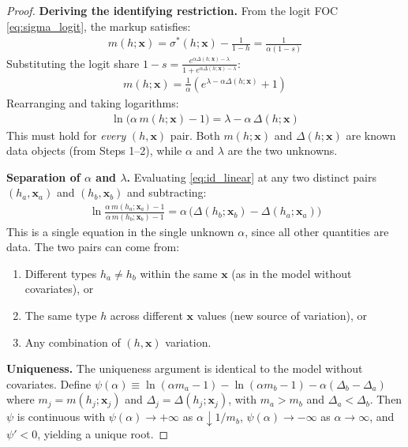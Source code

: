 \documentclass[12pt]{article}
\theoremstyle{plain}
\theoremstyle{plain}
\theoremstyle{definition}  %
\theoremstyle{remark}  %
\begin{document}
\begin{proof}
\textbf{Deriving the identifying restriction.} From the logit FOC \eqref{eq:sigma_logit}, the markup satisfies:
\begin{align*}
    m(h; \mathbf{x}) = \sigma^*(h; \mathbf{x}) - \frac{1}{1-h} = \frac{1}{\alpha(1-s)}
\end{align*}
Substituting the logit share $1-s = \frac{e^{\alpha\Delta(h;\mathbf{x})-\lambda}}{1+e^{\alpha\Delta(h;\mathbf{x})-\lambda}}$:
\begin{align*}
    m(h; \mathbf{x}) = \frac{1}{\alpha}\left(e^{\lambda - \alpha\Delta(h;\mathbf{x})} + 1\right)
\end{align*}
Rearranging and taking logarithms:
\begin{align}\label{eq:id_linear}
    \boxed{\;\ln\!\big(\alpha\, m(h;\mathbf{x}) - 1\big) = \lambda - \alpha\, \Delta(h;\mathbf{x})\;}
\end{align}
This must hold for \emph{every} $(h, \mathbf{x})$ pair. Both $m(h;\mathbf{x})$ and $\Delta(h;\mathbf{x})$ are known data objects (from Steps 1--2), while $\alpha$ and $\lambda$ are the two unknowns.

\medskip\noindent
\textbf{Separation of $\alpha$ and $\lambda$.} Evaluating \eqref{eq:id_linear} at any two distinct pairs $(h_a, \mathbf{x}_a)$ and $(h_b, \mathbf{x}_b)$ and subtracting:
\begin{align}\label{eq:id_alpha}
    \ln\frac{\alpha\, m(h_a;\mathbf{x}_a) - 1}{\alpha\, m(h_b;\mathbf{x}_b) - 1} = \alpha\,\big(\Delta(h_b;\mathbf{x}_b) - \Delta(h_a;\mathbf{x}_a)\big)
\end{align}
This is a single equation in the single unknown $\alpha$, since all other quantities are data. The two pairs can come from:
\begin{enumerate}
    \item[(a)] Different types $h_a \neq h_b$ within the same $\mathbf{x}$ (as in the model without covariates), or
    \item[(b)] The same type $h$ across different $\mathbf{x}$ values (new source of variation), or
    \item[(c)] Any combination of $(h, \mathbf{x})$ variation.
\end{enumerate}

\medskip\noindent
\textbf{Uniqueness.} The uniqueness argument is identical to the model without covariates. Define $\psi(\alpha) \equiv \ln(\alpha m_a - 1) - \ln(\alpha m_b - 1) - \alpha(\Delta_b - \Delta_a)$ where $m_j = m(h_j; \mathbf{x}_j)$ and $\Delta_j = \Delta(h_j; \mathbf{x}_j)$, with $m_a > m_b$ and $\Delta_a < \Delta_b$. Then $\psi$ is continuous with $\psi(\alpha) \to +\infty$ as $\alpha \downarrow 1/m_b$, $\psi(\alpha) \to -\infty$ as $\alpha \to \infty$, and $\psi' < 0$, yielding a unique root.


\end{proof}
\end{document}
